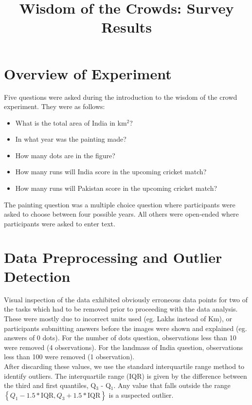 \documentclass{article}
\date{}
\begin{document}
\title{Wisdom of the Crowds: Survey Results}
\maketitle




\section*{Overview of Experiment}

Five questions were asked during the introduction to the wisdom of the crowd experiment. They were as follows: 
\begin{itemize}
\item What is the total area of India in km$^{2}$?
\item In what year was the painting made? 
\item How many dots are in the figure?
\item How many runs will India score in the upcoming cricket match?
\item How many runs will Pakistan score in the upcoming cricket match?
\end{itemize}

The painting question was a multiple choice question where participants were asked to choose between four possible years. All others were open-ended where participants were asked to enter text. \\


\section*{Data Preprocessing and Outlier Detection}

Visual inspection of the data exhibited obviously erroneous data points for two of the tasks which had to be removed prior to proceeding with the data analysis. These were mostly due to incorrect units used (eg. Lakhs instead of Km), or participants submitting answers before the images were shown and explained (eg. answers of 0 dots). For the number of dots question, observations less than 10 were removed (4 observations). For the landmass of India question, observations less than 100 were removed (1 observation).\\

After discarding these values, we use the standard interquartile range method to identify outliers. The interquartile range (IQR) is given by the difference between the third and first quantiles, Q$_{3}$ - Q$_{1}$. Any value that falls outside the range $\left\{ Q_{1} - 1.5*\text{IQR}, Q_{3}+1.5*\text{IQR} \right\}$ is a suspected outlier. 
\end{document}

